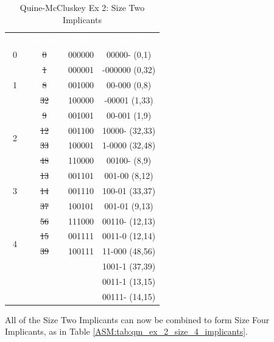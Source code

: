 \begin{table}[H]
	\sffamily
	\newcommand{\head}[1]{\textcolor{white}{\textbf{#1}}}		
	\begin{center}
		\begin{tabular}{ccc|c} 
			\rowcolor{black!75}
			\head{1's} & \head{Mntrm} & \head{Bin} & \head{Size 2} \\
							 0 & \sout{0} & 000000 & 00000- (0,1) \\
			\cline{1-3}
			\multirow{3}{*}{1} & \sout{1}  & 000001 & -000000 (0,32) \\
							   & \sout{8}  & 001000 & 00-000 (0,8) \\
							   & \sout{32} & 100000 & -00001 (1,33) \\
			\cline{1-3}
			\multirow{4}{*}{2} & \sout{9}  & 001001 & 00-001 (1,9) \\
							   & \sout{12} & 001100 & 10000- (32,33) \\		
				  			   & \sout{33} & 100001 & 1-0000 (32,48) \\		
							   & \sout{48} & 110000 & 00100- (8,9) \\
			\cline{1-3}
			\multirow{3}{*}{3} & \sout{13} & 001101 & 001-00 (8,12) \\
							   & \sout{14} & 001110 & 100-01 (33,37) \\		
							   & \sout{37} & 100101 & 001-01 (9,13) \\		
						       & \sout{56} & 111000 & 00110- (12,13) \\
			\cline{1-3}
			\multirow{2}{*}{4} & \sout{15} & 001111 & 0011-0 (12,14) \\
							   & \sout{39} & 100111 & 11-000 (48,56) \\		
							   &    &        & 1001-1 (37,39) \\		
							   &    &        & 0011-1 (13,15) \\		
							   &    &        & 00111- (14,15) \\		
			\hline
		\end{tabular}
	\end{center}
	\caption{Quine-McCluskey Ex 2: Size Two Implicants}
  \label{ASM:tab:qm_ex_2_size_2_implicants}
\end{table}

All of the Size Two Implicants can now be combined to form Size Four Implicants, as in Table \ref{ASM:tab:qm_ex_2_size_4_implicants}.

